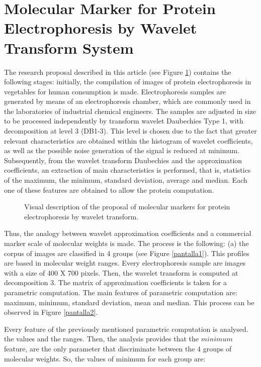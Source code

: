 \documentclass[a4paper]{llncs}
\begin{document}
\section{Molecular Marker for Protein Electrophoresis by Wavelet Transform System}

The research proposal described in this article (see Figure \ref{propuesta}) contains the following stages: initially, the compilation of images of protein electrophoresis in vegetables for human consumption is made. Electrophoresis samples are generated by means of an electrophoresis chamber, which are commonly used in the laboratories of industrial chemical engineers. The samples are adjusted in size to be processed independently by transform wavelet Daubechies Type 1, with decomposition at level 3 (DB1-3). This level is chosen due to the fact that greater relevant characteristics are obtained within the histogram of wavelet coefficients, as well as the possible noise generation of the signal is reduced at minimum. Subsequently, from the wavelet transform Daubechies and the approximation coefficients, an extraction of main characteristics is performed, that is, statistics of the maximum, the minimum, standard deviation, average and median. Each one of these features are obtained to allow the protein computation. 


\begin{figure}[h!]
\centering{
}
\caption{Visual description of the proposal of molecular markers for protein electrophoresis by wavelet transform.} \label{propuesta}
\end{figure}

Thus, the analogy between wavelet approximation coefficients and a commercial marker scale of molecular weights is made. The process is the following: (a) the corpus of images are classified in 4 groups (see Figure \ref{pantalla1}). This profiles are based in molecular weight ranges. Every electrophoresis sample are images with a size of 400 X 700 pixels. Then, the wavelet transform is computed at decomposition 3. The matrix of approximation coefficients is taken for a parametric computation. The main features of parametric computation are: maximum, minimum, standard deviation, mean and median. This process can be observed in Figure \ref{pantalla2}.


Every feature of the previously mentioned parametric computation is analysed. the values and the ranges. Then, the analysis provides that the $minimum$ feature, are the only parameter that discriminate between the 4 groups of molecular weights. So, the values of minimum for each group are:
\end{document}
